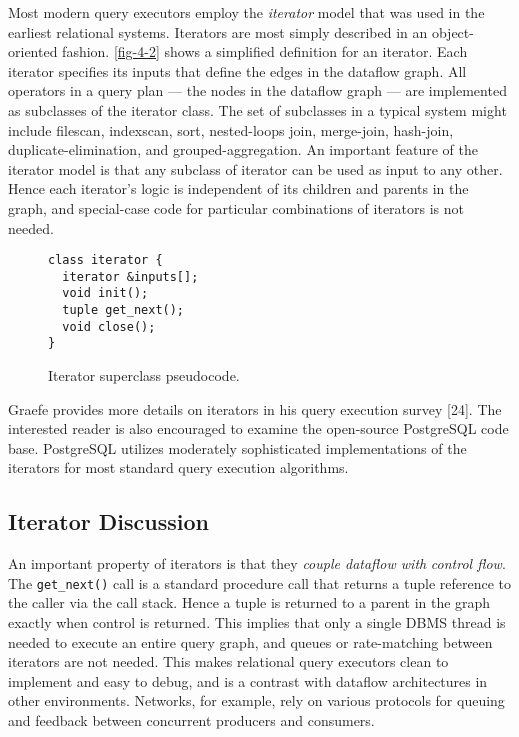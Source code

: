 \documentclass[b5paper,11pt,twoside,openright]{book}
\begin{document}
Most modern query executors employ the \emph{iterator} model that was
used in the earliest relational systems. Iterators are most simply
described in an object-oriented fashion. \autoref{fig-4-2} shows a simplified
definition for an iterator. Each iterator specifies its inputs that
define
the edges in the dataflow graph. All operators in a query plan --- the
nodes in the dataflow graph --- are implemented as subclasses of the
iterator class. The set of subclasses in a typical system might include
filescan, indexscan, sort, nested-loops join, merge-join, hash-join,
duplicate-elimination, and grouped-aggregation. An important feature of
the iterator model is that any subclass of iterator can be used as input
to any other. Hence each iterator's logic is independent of its children
and parents in the graph, and special-case code for particular
combinations of iterators is not needed.

\begin{figure}
\centering
\begin{BVerbatim}
class iterator {
  iterator &inputs[];
  void init();
  tuple get_next();
  void close();
}
\end{BVerbatim}

\caption{Iterator superclass pseudocode.\label{fig-4-2}}
\end{figure}

Graefe provides more details on iterators in his query execution survey
{[}24{]}. The interested reader is also encouraged to examine the
open-source PostgreSQL code base. PostgreSQL utilizes moderately
sophisticated implementations of the iterators for most standard query
execution algorithms.

\hypertarget{iterator-discussion}{%
\subsection{Iterator Discussion}\label{iterator-discussion}}

An important property of iterators is that they \emph{couple dataflow
with} \emph{control flow}. The \texttt{get\_next()} call is a standard procedure
call that returns a tuple reference to the caller via the call stack.
Hence a tuple is returned to a parent in the graph exactly when control
is returned. This implies that only a single DBMS thread is needed to
execute an entire query graph, and queues or rate-matching between
iterators are not needed. This makes relational query executors clean to
implement and easy to debug, and is a contrast with dataflow
architectures in other environments. Networks, for example, rely on
various protocols for queuing and feedback between concurrent producers
and consumers.
\end{document}

